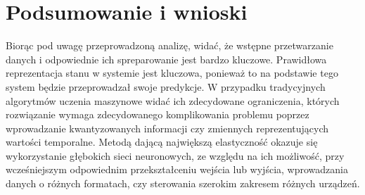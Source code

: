 \section{Podsumowanie i wnioski}
Biorąc pod uwagę przeprowadzoną analizę, widać, że wstępne przetwarzanie danych i odpowiednie ich spreparowanie jest bardzo kluczowe. Prawidłowa reprezentacja stanu w systemie jest kluczowa, ponieważ to na podstawie tego system będzie przeprowadzał swoje predykcje. W przypadku tradycyjnych algorytmów uczenia maszynowe widać ich zdecydowane ograniczenia, których rozwiązanie wymaga zdecydowanego komplikowania problemu poprzez wprowadzanie kwantyzowanych informacji czy zmiennych reprezentujących wartości temporalne. Metodą dającą największą elastyczność okazuje się wykorzystanie głębokich sieci neuronowych, ze względu na ich możliwość, przy wcześniejszym odpowiednim przekształceniu wejścia lub wyjścia, wprowadzania danych o różnych formatach, czy sterowania szerokim zakresem różnych urządzeń.
